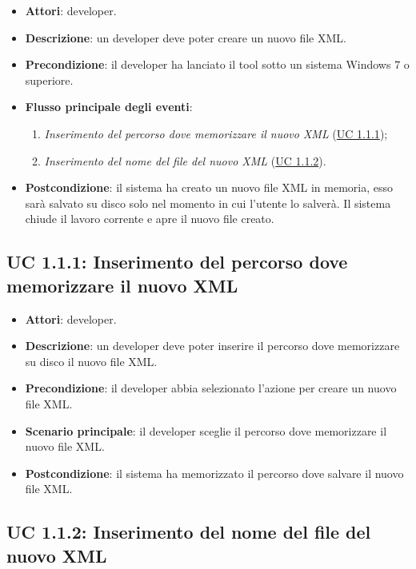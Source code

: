 		\begin{itemize}
			\item\textbf{Attori}: developer.
			\item\textbf{Descrizione}: un developer deve poter creare un nuovo file XML.
			\item\textbf{Precondizione}: il developer ha lanciato il tool sotto un sistema Windows 7 o superiore.
			\item\textbf{Flusso principale degli eventi}: 
			\begin{enumerate}
				\item\textit{Inserimento del percorso dove memorizzare il nuovo XML} (\hyperref[subsec:XEUC1.1.1]{UC 1.1.1});
				\item\textit{Inserimento del nome del file del nuovo XML} (\hyperref[subsec:XEUC1.1.2]{UC 1.1.2}).
			\end{enumerate}
			\item\textbf{Postcondizione}: il sistema ha creato un nuovo file XML in memoria, esso sarà salvato su disco solo nel momento in cui l'utente lo salverà. Il sistema chiude il lavoro corrente e apre il nuovo file creato.
		\end{itemize}
		
	\subsection{UC 1.1.1: Inserimento del percorso dove memorizzare il nuovo XML}
		\label{subsec:XEUC1.1.1}
		
		\begin{itemize}
			\item\textbf{Attori}: developer.
			\item\textbf{Descrizione}: un developer deve poter inserire il percorso dove memorizzare su disco il nuovo file XML.
			\item\textbf{Precondizione}: il developer abbia selezionato l'azione per creare un nuovo file XML.
			\item\textbf{Scenario principale}: il developer sceglie il percorso dove memorizzare il nuovo file XML.
			\item\textbf{Postcondizione}: il sistema ha memorizzato il percorso dove salvare il nuovo file XML.
		\end{itemize}
		
	\subsection{UC 1.1.2: Inserimento del nome del file del nuovo XML}
		\label{subsec:XEUC1.1.2}
		
